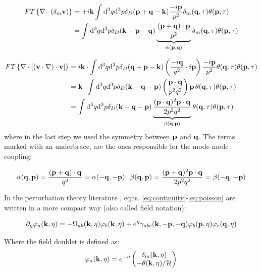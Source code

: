 \begin{align*}
\mathit{FT}\left\{ \nabla\cdot(\delta_{m}\mathbf{v})\right\}  & =+i\mathbf{k}\int\mathrm{d}^{3}q\mathrm{d}^{3}p\delta_{D}(\mathbf{p}+\mathbf{q}-\mathbf{k})\frac{-i\mathbf{p}}{p^{2}}\delta_{m}(\mathbf{q},\tau)\theta(\mathbf{p},\tau)\\
& =\int\mathrm{d}^{3}q\mathrm{d}^{3}p\delta_{D}(\mathbf{k}-\mathbf{p}-\mathbf{q})\underbrace{\frac{\left(\mathbf{p}+\mathbf{q}\right)\cdot\mathbf{p}}{p^{2}}}_{\alpha(\mathbf{p},\mathbf{q})}\delta_{m}(\mathbf{q},\tau)\theta(\mathbf{p},\tau)
\end{align*}


\begin{align*}
\mathit{FT}\left\{ \nabla\cdot\left[\left(\mathbf{v}\cdot\nabla\right)\cdot\mathbf{v}\right]\right\}  & =i\mathbf{k}\cdot\int\mathrm{d}^{3}q\mathrm{d}^{3}p\delta_{D}(\mathbf{q}+\mathbf{p}-\mathbf{k})\left(\frac{-i\mathbf{q}}{q^{2}}\cdot i\mathbf{p}\right)\frac{-i\mathbf{p}}{p^{2}}\theta(\mathbf{q},\tau)\theta(\mathbf{p},\tau)\\
& =\mathbf{k}\cdot\int\mathrm{d}^{3}q\mathrm{d}^{3}p\delta_{D}(\mathbf{k}-\mathbf{q}-\mathbf{p})\left(\frac{\mathbf{p}\cdot\mathbf{q}}{p^{2}q^{2}}\right)\mathbf{p}\,\theta(\mathbf{q},\tau)\theta(\mathbf{p},\tau)\\
& =\int\mathrm{d}^{3}q\mathrm{d}^{3}p\delta_{D}(\mathbf{k}-\mathbf{q}-\mathbf{p})\underbrace{\frac{(\mathbf{p}\cdot\mathbf{q})^{2}\mathbf{p}\cdot\mathbf{q}}{2p^{2}q^{2}}}_{\beta(\mathbf{q},\mathbf{p})}\theta(\mathbf{q},\tau)\theta(\mathbf{p},\tau)
\end{align*}
where in the last step we used the symmetry between $\mathbf{p}$ and $\mathbf{q}$.
The terms marked with an underbrace, are the ones responsible for
the mode-mode coupling:

\begin{equation}
\alpha(\mathbf{q},\mathbf{p})=\frac{(\mathbf{p}+\mathbf{q})\cdot\mathbf{q}}{q^{2}}=\alpha(-\mathbf{q},-\mathbf{p});\;\beta(\mathbf{q},\mathbf{p})=\frac{(\mathbf{p}+\mathbf{q})^{2}\mathbf{p}\cdot\mathbf{q}}{2p^{2}q^{2}}=\beta(-\mathbf{q},-\mathbf{p})\label{eq:alpha-beta-func}
\end{equation}

In the perturbation theory literature \cite{bernardeau_large-scale_2001,crocce_renormalized_2005,pietroni_flowing_2008},
eqns. \ref{eq:continuity}-\ref{eq:poisson} are written in a more
compact way (also called field notation):

\begin{equation}
\partial_{\eta}\varphi_{a}(\mathbf{k},\eta)=-\Omega_{ab}(\mathbf{k},\eta)\varphi_{b}(\mathbf{k},\eta)+e^{\eta}\gamma_{abc}(\mathbf{k},\mathbf{-p},\mathbf{-q})\varphi_{b}(\mathbf{p},\eta)\varphi_{c}(\mathbf{q},\eta)\label{eq:field notation}
\end{equation}


Where the field doublet is defined as: 
\begin{equation}
\varphi_{a}(\mathbf{k},\eta)=e^{-\eta}\begin{pmatrix}\delta_{m}(\mathbf{k},\eta)\\ -\theta(\mathbf{k},\eta)/\mathcal{H} \end{pmatrix}\label{eq:field-doublet}
\end{equation}


